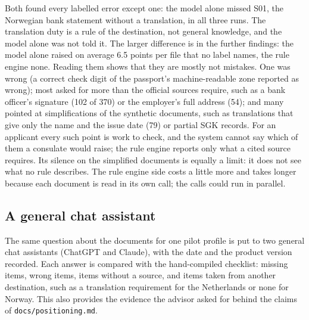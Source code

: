 Both found every labelled error except one: the model alone missed S01, the Norwegian bank
statement without a translation, in all three runs. The translation duty is a rule of the
destination, not general knowledge, and the model alone was not told it. The larger difference is
in the further findings: the model alone raised on average 6.5 points per file that no label names, the
rule engine none. Reading them shows that they are mostly not mistakes. One was wrong (a correct
check digit of the passport's machine-readable zone reported as wrong); most asked for more than
the official sources require, such as a bank officer's signature (102 of 370) or the employer's full
address (54); and many pointed at simplifications of the synthetic documents, such as translations
that give only the name and the issue date (79) or partial SGK records. For an applicant every such
point is work to check, and the system cannot say which of them a consulate would raise; the rule
engine reports only what a cited source requires. Its silence on the simplified documents is
equally a limit: it does not see what no rule describes. The rule engine side costs a little more
and takes longer because each document is read in its own call; the calls could run in parallel.

\subsection{A general chat assistant}\label{sec:chat-eval}
The same question about the documents for one pilot profile is put to two general chat assistants
(ChatGPT and Claude), with the date and the product version recorded. Each answer is compared with
the hand-compiled checklist: missing items, wrong items, items without a source, and items taken
from another destination, such as a translation requirement for the Netherlands or none for
Norway. This also provides the evidence the advisor asked for behind the claims of
\texttt{docs/positioning.md}.

